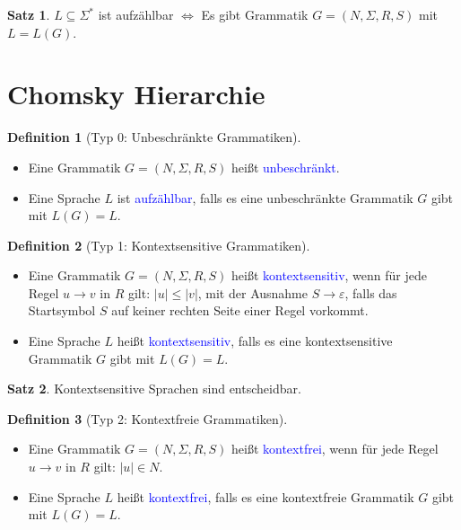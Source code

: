 \documentclass{scrreprt}
\theoremstyle{definition}
\newtheorem{Definition}{Definition}[section]
\newtheorem{Satz}{Satz}[section]
\theoremstyle{example}
\theoremstyle{algorithm}
\begin{document}
\begin{Satz}
$L\subseteq\Sigma^*$ ist aufzählbar $\Leftrightarrow$ Es gibt Grammatik $G=(N,\Sigma,R,S)$ mit $L = L(G)$.
\end{Satz}

\section{Chomsky Hierarchie}
\begin{Definition}[Typ 0: Unbeschränkte Grammatiken]
\noindent
\begin{itemize}
\item
Eine Grammatik $G=(N,\Sigma,R,S)$ heißt \textcolor{blue}{unbeschränkt}.
\item
Eine Sprache $L$ ist \textcolor{blue}{aufzählbar}, falls es eine unbeschränkte Grammatik $G$ gibt mit $L(G)=L$.
\end{itemize}
\end{Definition}

\begin{Definition}[Typ 1: Kontextsensitive Grammatiken]
\noindent
\begin{itemize}
\item
Eine Grammatik $G=(N,\Sigma,R,S)$ heißt \textcolor{blue}{kontextsensitiv}, wenn für jede Regel $u\rightarrow v$ in $R$ gilt: $|u| \leq |v|$, mit der Ausnahme $S \rightarrow \varepsilon$, falls das Startsymbol $S$ auf keiner rechten Seite einer Regel vorkommt.
\item
Eine Sprache $L$ heißt \textcolor{blue}{kontextsensitiv}, falls es eine kontextsensitive Grammatik $G$ gibt mit $L(G)=L$.
\end{itemize}
\end{Definition}

\begin{Satz}
Kontextsensitive Sprachen sind entscheidbar.
\end{Satz}

\begin{Definition}[Typ 2: Kontextfreie Grammatiken]
\noindent
\begin{itemize}
\item
Eine Grammatik $G=(N,\Sigma,R,S)$ heißt \textcolor{blue}{kontextfrei}, wenn für jede Regel $u\rightarrow v$ in $R$ gilt: $|u| \in N$.
\item
Eine Sprache $L$ heißt \textcolor{blue}{kontextfrei}, falls es eine kontextfreie Grammatik $G$ gibt mit $L(G)=L$.
\end{itemize}
\end{Definition}
\end{document}
